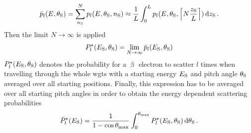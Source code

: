 \begin{equation}
    \label{eq:EnergyDepScatProbsAppendixZAverage}
    \bar{p}_l(E,\theta_\mathrm{S}) = 
    \sum_{n_\mathrm{S}}^{N} p_l(E,\theta_\mathrm{S},n_\mathrm{S}) \approx
    \frac{1}{L}
    \int_{0}^{L}
        p_l(E,\theta_\mathrm{S},
            \left\lceil N \frac{z_\mathrm{S}}{L}\right\rceil
        )
    \mathop{}\!\mathrm{d} z_\mathrm{S}
    \text{\,.}
\end{equation}
Then the limit $N\rightarrow\infty$ is applied
\begin{equation}
  P^{\star}_l(E_\mathrm{S},\theta_\mathrm{S}) = 
    \lim_{N\rightarrow\infty} \bar{p}_l(E_\mathrm{S},\theta_\mathrm{S})
    \label{eq:energyDepScatProbsAppendix}
\end{equation}
$P^{\star}_l(E_\mathrm{S},\theta_\mathrm{S})$ denotes the probability for a $\upbeta$ electron to scatter $l$ times when travelling through the whole \gls{wgts} with a starting energy $E_\mathrm{S}$ and pitch angle $\theta_\mathrm{S}$ averaged over all starting positions. Finally, this expression has to be averaged over all starting pitch angles in order to obtain the energy dependent scattering probabilities
\begin{equation}
    \bar{P}^{\star}_l(E_\mathrm{S}) = 
    \frac{1}{1-\cos\theta_\mathrm{max}}
    \int_0^{\theta_\mathrm{max}}
        P^{\star}_l(E_\mathrm{S},\theta_\mathrm{S}) 
        \mathop{}\!\mathrm{d} \theta_\mathrm{S}
    \text{\,.}
    \label{eq:averagedEnergyDepScatProbsAppendix}
\end{equation}

